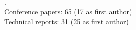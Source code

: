 \documentclass[12pt]{article}
\begin{document}
\nocite{*}
\printbibliography[heading=none]
\\
.\\
Conference papers: 65 (17 as first author)\\ %
Technical reports: 31 (25 as first author)\\ %
\end{document}
